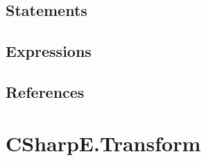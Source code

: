 
\subsection{Statements}

\subsection{Expressions}

\subsection{References}

\section{CSharpE.Transform}


\label{no-parent}